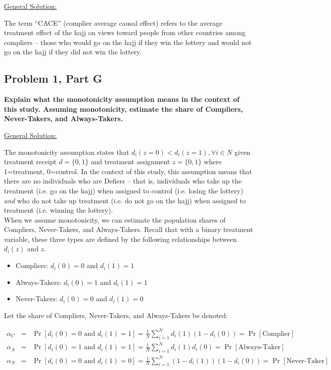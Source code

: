 \documentclass[11pt,notitlepage]{article}
\def\Pr{\mathop{\text{Pr}}}
\begin{document}
\vspace{1cm}

\underline{{\sc General Solution:}}

The term ``CACE'' (complier average causal effect) refers to the average treatment effect of the hajj on views toward people from other countries among compliers -- those who would go on the hajj if they win the lottery and would not go on the hajj if they did not win the lottery.


\subsection{Problem 1, Part G} {\bf Explain what the monotonicity assumption means in the context of this study.  Assuming monotonicity, estimate the share of Compliers, Never-Takers, and Always-Takers.}


\vspace{1cm}


\underline{{\sc General Solution:}}

The monotonicity assumption states that $d_i(z=0) < d_i(z=1), \forall i \in N$ given treatment receipt $d = \lbrace 0, 1 \rbrace$ and treatment assignment $z = \lbrace 0, 1 \rbrace$ where 1=treatment, 0=control. In the context of this study, this assumption means that there are no individuals who are Defiers -- that is, individuals who take up the treatment (i.e. go on the hajj) when assigned to control (i.e. losing the lottery) {\em and} who do not take up treatment (i.e. do not go on the hajj) when assigned to treatment (i.e. winning the lottery).\\

When we assume monotonicity, we can estimate the population shares of Compliers, Never-Takers, and Always-Takers. Recall that with a binary treatment variable, these three types are defined by the following relationships between $d_i(z)$ and $z$.

\begin{itemize}
\item Compliers: $d_i(0) = 0$ and $d_i(1) = 1$
\item Always-Takers: $d_i(0) = 1$ and $d_i(1) = 1$
\item Never-Takers:  $d_i(0) = 0$ and $d_i(1) = 0$
\end{itemize}

Let the share of Compliers, Never-Takers, and Always-Takers be denoted:

\begin{eqnarray*}
\alpha_C &=& \Pr[ d_i(0) = 0 \text{ and } d_i(1) = 1 ] = \frac{1}{N} \sum_{i=1}^N d_i(1)(1-d_i(0))  = \Pr[\text{Complier}] \\
\alpha_A &=& \Pr[ d_i(0) = 1 \text{ and } d_i(1) = 1 ] = \frac{1}{N} \sum_{i=1}^N d_i(1)d_i(0) = \Pr[\text{Always-Taker}] \\
\alpha_N &=& \Pr[ d_i(0) = 0 \text{ and } d_i(1) = 0 ] = \frac{1}{N} \sum_{i=1}^N (1 - d_i(1))(1-d_i(0)) = \Pr[\text{Never-Taker}] 
\end{eqnarray*}
\end{document}
